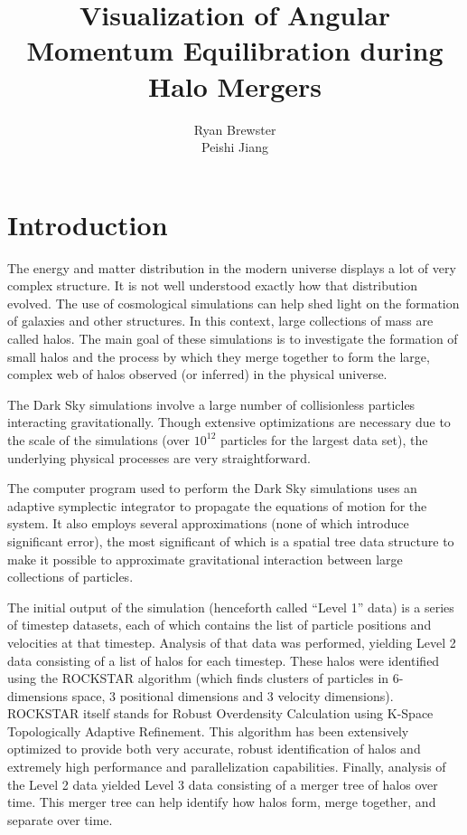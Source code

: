 \documentclass[12pt]{article}
\title{Visualization of Angular Momentum Equilibration during Halo Mergers}
\author{Ryan Brewster \\ Peishi Jiang}
\begin{document}
\maketitle

\section{Introduction}

The energy and matter distribution in the modern universe displays a lot of
very complex structure. It is not well understood exactly how that distribution
evolved. The use of cosmological simulations can help shed light on the
formation of galaxies and other structures. In this context, large collections
of mass are called halos. The main goal of these simulations is to investigate
the formation of small halos and the process by which they merge together to
form the large, complex web of halos observed (or inferred) in the physical
universe.

The Dark Sky simulations  involve a large number of collisionless particles
interacting gravitationally. Though extensive optimizations are necessary due
to the scale of the simulations (over $10^{12}$ particles for the largest data
set), the underlying physical processes are very straightforward.

The computer program used to perform the Dark Sky simulations uses an adaptive
symplectic integrator to propagate the equations of motion for the system. It
also employs several approximations (none of which introduce significant
error), the most significant of which is a spatial tree data structure to make
it possible to approximate gravitational interaction between large collections
of particles.

The initial output of the simulation (henceforth called ``Level 1'' data) is
a series of timestep datasets, each of which contains the list of particle
positions and velocities at that timestep. Analysis of that data was performed,
yielding Level 2 data consisting of a list of halos for each timestep. These
halos were identified using the ROCKSTAR algorithm (which finds clusters of
particles in 6-dimensions space, 3 positional dimensions and 3 velocity
dimensions). ROCKSTAR itself stands for Robust Overdensity Calculation using
K-Space Topologically Adaptive Refinement. This algorithm has been extensively
optimized to provide both very accurate, robust identification of halos and
extremely high performance and parallelization capabilities. Finally, analysis
of the Level 2 data yielded Level 3 data consisting of a merger tree of halos
over time. This merger tree can help identify how halos form, merge together,
and separate over time.
\end{document}
